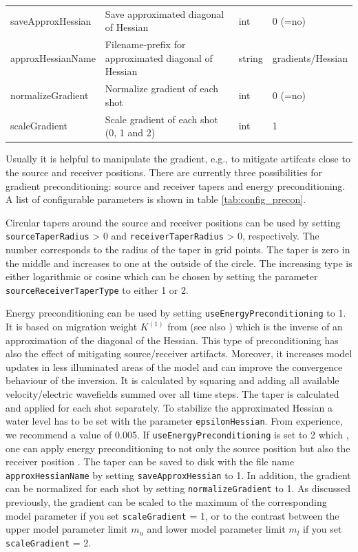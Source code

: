 \documentclass[pdftex,a4paper,parskip,listof=totoc,bibliography=totoc,onehalfspacing,12pt]{scrreprt}
\begin{document}
\begin{table}[h!]
\begin{adjustbox}{width=1\textwidth,center=\textwidth}
\begin{tabular}{llll}
         saveApproxHessian        & Save approximated diagonal of Hessian                               &  int   & 0 (=no) \\
         approxHessianName        & Filename-prefix for approximated diagonal of Hessian                   & string & gradients/Hessian \\
         normalizeGradient        & Normalize gradient of each shot                                     &  int   & 0 (=no) \\
         scaleGradient        & Scale gradient of each shot (0, 1 and 2)                                     &  int   & 1 \\
	\bottomrule
	\end{tabular}
	\end{adjustbox}
\end{table}
Usually it is helpful to manipulate the gradient, e.g., to mitigate artifcats close to the source and receiver positions. There are currently three possibilities for gradient preconditioning: source and receiver tapers and energy preconditioning. A list of configurable parameters is shown in table \ref{tab:config_precon}.

Circular tapers around the source and receiver positions can be used by setting \verb+sourceTaperRadius+ > 0 and \verb+receiverTaperRadius+ > 0, respectively. The number corresponds to the radius of the taper in grid points. The taper is zero in the middle and increases to one at the outside of the circle. The increasing type is either logarithmic or cosine which can be chosen by setting the parameter \verb+sourceReceiverTaperType+ to either 1 or 2.

Energy preconditioning can be used by setting \verb+useEnergyPreconditioning+ to 1. It is based on migration weight $K^{(1)}$ from \cite{plessix2004frequency} (see also \cite{shin2001improved}) which is the inverse of an approximation of the diagonal of the Hessian. This type of preconditioning has also the effect of mitigating source/receiver artifacts. Moreover, it increases model updates in less illuminated areas of the model and can improve the convergence behaviour of the inversion. It is calculated by squaring and adding all available velocity/electric wavefields summed over all time steps. The taper is calculated and applied for each shot separately. To stabilize the approximated Hessian a water level has to be set with the parameter \verb+epsilonHessian+. From experience, we recommend a value of 0.005. If \verb+useEnergyPreconditioning+ is set to 2 which , one can apply energy preconditioning to not only the source position but also the receiver position \citep{kurzmann2013acoustic}.
The taper can be saved to disk with the file name \verb+approxHessianName+ by setting \verb+saveApproxHessian+ to 1.
In addition, the gradient can be normalized for each shot by setting \verb+normalizeGradient+ to 1.
As discussed previously, the gradient can be scaled to the maximum of the corresponding model parameter if you set \verb+scaleGradient+ = 1, or to the contrast between the upper model parameter limit $m_u$ and lower model parameter limit $m_l$ if you set \verb+scaleGradient+ = 2.
\end{document}
